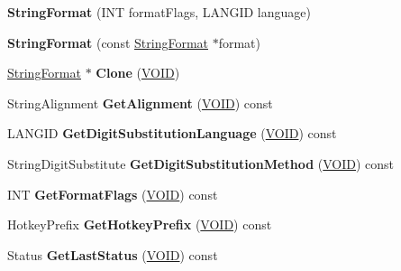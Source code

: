 \begin{DoxyCompactItemize}
\item 
\mbox{\label{class_string_format_aa0553340a01eadad01c0d16058afd17b}} 
{\bfseries String\+Format} (I\+NT format\+Flags, L\+A\+N\+G\+ID language)
\item 
\mbox{\label{class_string_format_a0f519de2dc620321023e8a42cc511dfc}} 
{\bfseries String\+Format} (const \hyperlink{class_string_format}{String\+Format} $\ast$format)
\item 
\mbox{\label{class_string_format_abbc505a309b875b78d3ddf09be9aefdd}} 
\hyperlink{class_string_format}{String\+Format} $\ast$ {\bfseries Clone} (\hyperlink{interfacevoid}{V\+O\+ID})
\item 
\mbox{\label{class_string_format_a0b750acd9a4492461c5e1aa8d8e89299}} 
String\+Alignment {\bfseries Get\+Alignment} (\hyperlink{interfacevoid}{V\+O\+ID}) const
\item 
\mbox{\label{class_string_format_aea2ae4afa998e16e5bae47b1dc07396b}} 
L\+A\+N\+G\+ID {\bfseries Get\+Digit\+Substitution\+Language} (\hyperlink{interfacevoid}{V\+O\+ID}) const
\item 
\mbox{\label{class_string_format_a7e9332f2f96eff2fa0489ab999a38b32}} 
String\+Digit\+Substitute {\bfseries Get\+Digit\+Substitution\+Method} (\hyperlink{interfacevoid}{V\+O\+ID}) const
\item 
\mbox{\label{class_string_format_a81018ff4cdff0242f8bdb21e6fecd8c1}} 
I\+NT {\bfseries Get\+Format\+Flags} (\hyperlink{interfacevoid}{V\+O\+ID}) const
\item 
\mbox{\label{class_string_format_a954be302b0bffe38af35aca1ea2718dd}} 
Hotkey\+Prefix {\bfseries Get\+Hotkey\+Prefix} (\hyperlink{interfacevoid}{V\+O\+ID}) const
\item 
\mbox{\label{class_string_format_ac6fbdbc9926e8ba64cd2c29c88cadbc0}} 
Status {\bfseries Get\+Last\+Status} (\hyperlink{interfacevoid}{V\+O\+ID}) const
\item 

\end{DoxyCompactItemize}
